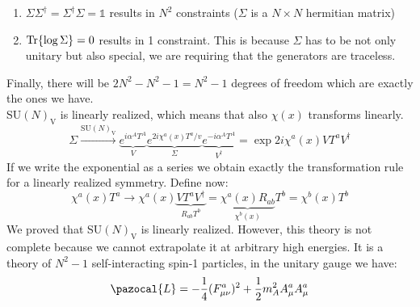 \documentclass[../main.tex]{subfiles}
\begin{document}
\begin{enumerate}
    \item $\Sigma\Sigma^\dagger=\Sigma^\dagger\Sigma=\mathbb{1}$ results in $N^2$ constraints ($\Sigma$ is a $N\times N$ hermitian matrix)
    \item $\Tr{\log\Sigma}=0$ results in 1 constraint. This is because $\Sigma$ has to be not only unitary but also special, we are requiring that the generators are traceless.
\end{enumerate}
Finally, there will be $2N^2-N^2-1=N^2-1$ degrees of freedom which are exactly the ones we have.\\
SU$(N)_{\text{V}}$ is linearly realized, which means that also $\chi(x)$ transforms linearly.
\[
\Sigma\xrightarrow[]{\text{SU}(N)_{\text{V}}}\underbrace{e^{i\alpha^AT^A}}_{V}\underbrace{e^{2i\chi^a(x)T^a/v}}_{\Sigma}\underbrace{e^{-i\alpha^AT^A}}_{V^\dagger}=\exp{2i\chi^a(x)VT^aV^\dagger}
\]
If we write the exponential as a series we obtain exactly the transformation rule for a linearly realized symmetry. Define now:
\[
\chi^a(x)T^a\to\chi^a(x)\underbrace{VT^aV^\dagger}_{R_{ab}T^b}=\underbrace{\chi^a(x)R_{ab}}_{\chi^b(x)}T^b=\chi^b(x)T^b
\]
We proved that SU$(N)_{\text{V}}$ is linearly realized. However, this theory is not complete because we cannot extrapolate it at arbitrary high energies. It is a theory of $N^2-1$ self-interacting spin-1 particles, in the unitary gauge we have:
\[
\pazocal{L}=-\frac{1}{4}(F_{\mu\nu}^a)^2+\frac{1}{2}m_A^2A_\mu^aA_\mu^a
\]
\end{document}
